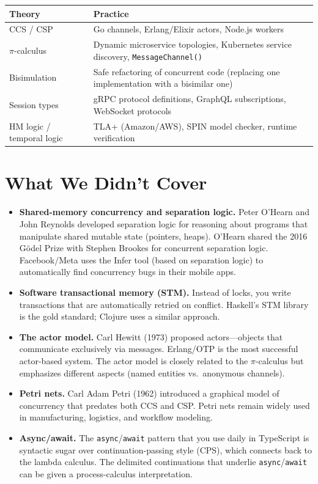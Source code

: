 \documentclass[11pt, a4paper, oneside]{book}
\newcommand{\lc}[1]{\texttt{#1}}
\begin{document}
\begin{center}
\begin{tabular}{lp{8cm}}
  \toprule
  \textbf{Theory} & \textbf{Practice} \\
  \midrule
  CCS / CSP & Go channels, Erlang/Elixir actors, Node.js workers \\
  $\pi$-calculus & Dynamic microservice topologies, Kubernetes service discovery, \lc{MessageChannel()} \\
  Bisimulation & Safe refactoring of concurrent code (replacing one implementation with a bisimilar one) \\
  Session types & gRPC protocol definitions, GraphQL subscriptions, WebSocket protocols \\
  HM logic / temporal logic & TLA+ (Amazon/AWS), SPIN model checker, runtime verification \\
  \bottomrule
\end{tabular}
\end{center}

\section{What We Didn't Cover}

\begin{itemize}[nosep]
\item \textbf{Shared-memory concurrency and separation logic.} Peter O'Hearn
  and John Reynolds developed separation logic for reasoning about programs
  that manipulate shared mutable state (pointers, heaps). O'Hearn shared
  the 2016 Gödel Prize with Stephen Brookes for concurrent separation logic. Facebook/Meta uses the Infer tool
  (based on separation logic) to automatically find concurrency bugs in their
  mobile apps.
\item \textbf{Software transactional memory (STM).} Instead of locks, you
  write transactions that are automatically retried on conflict. Haskell's
  STM library is the gold standard; Clojure uses a similar approach.
\item \textbf{The actor model.} Carl Hewitt (1973) proposed actors---objects
  that communicate exclusively via messages. Erlang/OTP is the most
  successful actor-based system. The actor model is closely related to the
  $\pi$-calculus but emphasizes different aspects (named entities vs.\
  anonymous channels).
\item \textbf{Petri nets.} Carl Adam Petri (1962) introduced a graphical
  model of concurrency that predates both CCS and CSP. Petri nets remain
  widely used in manufacturing, logistics, and workflow modeling.
\item \textbf{Async/await.} The \lc{async}/\lc{await} pattern that you use
  daily in TypeScript is syntactic sugar over continuation-passing style
  (CPS), which connects back to the lambda calculus. The delimited
  continuations that underlie \lc{async}/\lc{await} can be given a
  process-calculus interpretation.
\end{itemize}
\end{document}
